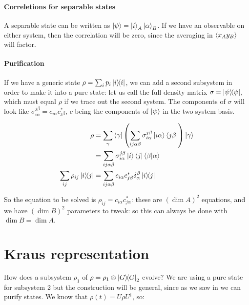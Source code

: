 \documentclass[main.tex]{subfiles}
\begin{document}
\paragraph{Correletions for separable states}

A separable state can be written as \(\ket{\psi} = \ket{i}_A \ket{\alpha}_B\). If we have an observable on either system, then the correlation will be zero, since the averaging in \(\expval{x_Ay_B} \) will factor.

\paragraph{Purification} \label{par:purification}

If we have a generic state \(\rho = \sum _{i} p_i \dyad{i}  \), we can add a second subsystem in order to make it into a pure state: let us call the full density matrix \(\sigma = \dyad{\psi} \), which must equal \(\rho\) if we trace out the second system. The components of \(\sigma\) will look like \(\sigma_{i \alpha} ^{j \beta} = c_{i \alpha} c^*_{j \beta}\), \(c\) being the components of \(\ket{\psi } \) in the two-system basis.

\begin{subequations}
\begin{align}
    \rho &= \sum _{\gamma}  \bra{\gamma}
    \qty(\sum _{ij \alpha \beta} \sigma_{i \alpha} ^{j \beta} \ket{i \alpha} \bra{j \beta}   )
    \ket{\gamma}  \\
    &= \sum _{ij \alpha \beta} \sigma_{i \alpha} ^{j \beta} \ket{i} \bra{j} \braket{\beta}{\alpha}  \\
    \sum _{ij} \rho_{ij} \ketbra{i}{j} &= \sum_{ij \alpha \beta} c_{i \alpha} c^*_{j \beta} \delta_ \alpha ^ \beta \ketbra{i}{j}
\end{align}
\end{subequations}

So the equation to be solved is \(\rho_{ij} = c_{i \alpha} c_{j \alpha}^*\): these are \((\dim A)^2\) equations, and we have \((\dim B)^2\) parameters to tweak: so this can always be done with \(\dim B = \dim A\).

\section{Kraus representation}

How does a subsystem \(\rho_1\) of \(\rho = \rho_1 \otimes \dyad{G}_2 \) evolve? We are using a pure state for subsystem 2 but the construction will be general, since as we saw in  we can purify states.
We know that \(\rho(t) = U \rho U^\dag\), so:
\end{document}
